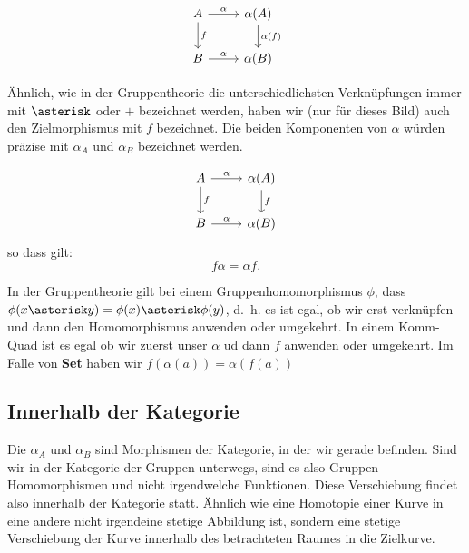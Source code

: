 \documentclass[a4paper]{amsart}
\theoremstyle{definition}
\begin{document}
\begin{equation}
    \begin{tikzcd}
        A   \arrow[d, "f"]  \arrow[r, "\alpha"] & \alpha(A) \arrow[d, "\alpha(f)"]\\
        B                   \arrow[r, "\alpha"] & \alpha(B)
    \end{tikzcd}
\end{equation}

Ähnlich, wie in der Gruppentheorie die unterschiedlichsten Verknüpfungen immer mit $\asterisk$ oder $+$ bezeichnet werden, haben wir (nur für dieses Bild) auch den Zielmorphismus mit $f$ bezeichnet. Die beiden Komponenten von $\alpha$ würden präzise mit $\alpha_A$ und $\alpha_B$ bezeichnet werden.

\begin{equation}
    \begin{tikzcd}
        A   \arrow[d, "f"]  \arrow[r, "\alpha"] & \alpha(A) \arrow[d, "f"]\\
        B                   \arrow[r, "\alpha"] & \alpha(B)
    \end{tikzcd}
\end{equation}
so dass gilt:
\begin{equation}
    f\alpha = \alpha f.
\end{equation}

In der Gruppentheorie gilt bei einem Gruppenhomomorphismus $\phi$, dass $\phi(x \asterisk y) = \phi(x) \asterisk \phi(y)$, d.~h. es ist egal, ob wir erst verknüpfen und dann den Homomorphismus anwenden oder umgekehrt. In einem Komm-Quad ist es egal ob wir zuerst unser $\alpha$ ud dann $f$ anwenden oder umgekehrt. Im Falle von \textbf{Set} haben wir $f(\alpha(a)) = \alpha( f(a))$

\subsection{Innerhalb der Kategorie }
Die $\alpha_A$ und $\alpha_B$ sind Morphismen der Kategorie, in der wir gerade befinden. Sind wir in der Kategorie der Gruppen unterwegs, sind es also Gruppen-Homomorphismen und nicht irgendwelche  Funktionen. Diese Verschiebung findet also innerhalb der Kategorie statt. Ähnlich wie eine Homotopie einer Kurve in eine andere nicht irgendeine stetige Abbildung ist, sondern eine stetige Verschiebung der Kurve innerhalb des betrachteten Raumes in die Zielkurve.
\end{document}
